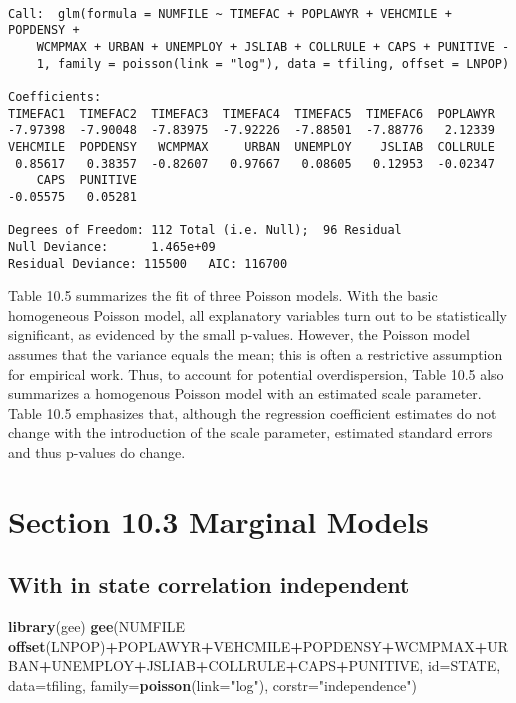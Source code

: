 \documentclass[]{book}
\newenvironment{Shaded}{\begin{snugshade}}{\end{snugshade}}
\newcommand{\DataTypeTok}[1]{\textcolor[rgb]{0.13,0.29,0.53}{#1}}
\newcommand{\KeywordTok}[1]{\textcolor[rgb]{0.13,0.29,0.53}{\textbf{#1}}}
\newcommand{\NormalTok}[1]{#1}
\newcommand{\OperatorTok}[1]{\textcolor[rgb]{0.81,0.36,0.00}{\textbf{#1}}}
\newcommand{\StringTok}[1]{\textcolor[rgb]{0.31,0.60,0.02}{#1}}
\begin{document}
\begin{verbatim}

Call:  glm(formula = NUMFILE ~ TIMEFAC + POPLAWYR + VEHCMILE + POPDENSY + 
    WCMPMAX + URBAN + UNEMPLOY + JSLIAB + COLLRULE + CAPS + PUNITIVE - 
    1, family = poisson(link = "log"), data = tfiling, offset = LNPOP)

Coefficients:
TIMEFAC1  TIMEFAC2  TIMEFAC3  TIMEFAC4  TIMEFAC5  TIMEFAC6  POPLAWYR  
-7.97398  -7.90048  -7.83975  -7.92226  -7.88501  -7.88776   2.12339  
VEHCMILE  POPDENSY   WCMPMAX     URBAN  UNEMPLOY    JSLIAB  COLLRULE  
 0.85617   0.38357  -0.82607   0.97667   0.08605   0.12953  -0.02347  
    CAPS  PUNITIVE  
-0.05575   0.05281  

Degrees of Freedom: 112 Total (i.e. Null);  96 Residual
Null Deviance:      1.465e+09 
Residual Deviance: 115500   AIC: 116700
\end{verbatim}

Table 10.5 summarizes the fit of three Poisson models. With the basic homogeneous Poisson model, all explanatory variables turn out to be statistically significant, as evidenced by the small p-values. However, the Poisson model assumes that the variance equals the mean; this is often a restrictive assumption for empirical work. Thus, to account for potential overdispersion, Table 10.5 also summarizes a homogenous Poisson model with an estimated scale parameter. Table 10.5 emphasizes that, although the regression coefficient estimates do not change with the introduction of the scale parameter, estimated standard
errors and thus p-values do change.

\hypertarget{section-10.3-marginal-models}{%
\section{Section 10.3 Marginal Models}\label{section-10.3-marginal-models}}

\hypertarget{with-in-state-correlation-independent}{%
\subsection{With in state correlation independent}\label{with-in-state-correlation-independent}}

\begin{Shaded}
\begin{Highlighting}[]
\KeywordTok{library}\NormalTok{(gee)}
\KeywordTok{gee}\NormalTok{(NUMFILE }\OperatorTok{~}\StringTok{ }\KeywordTok{offset}\NormalTok{(LNPOP)}\OperatorTok{+}\NormalTok{POPLAWYR}\OperatorTok{+}\NormalTok{VEHCMILE}\OperatorTok{+}\NormalTok{POPDENSY}\OperatorTok{+}\NormalTok{WCMPMAX}\OperatorTok{+}\NormalTok{URBAN}\OperatorTok{+}\NormalTok{UNEMPLOY}\OperatorTok{+}\NormalTok{JSLIAB}\OperatorTok{+}\NormalTok{COLLRULE}\OperatorTok{+}\NormalTok{CAPS}\OperatorTok{+}\NormalTok{PUNITIVE, }\DataTypeTok{id=}\NormalTok{STATE, }\DataTypeTok{data=}\NormalTok{tfiling, }\DataTypeTok{family=}\KeywordTok{poisson}\NormalTok{(}\DataTypeTok{link=}\StringTok{"log"}\NormalTok{), }\DataTypeTok{corstr=}\StringTok{"independence"}\NormalTok{) }
\end{Highlighting}
\end{Shaded}
\end{document}
